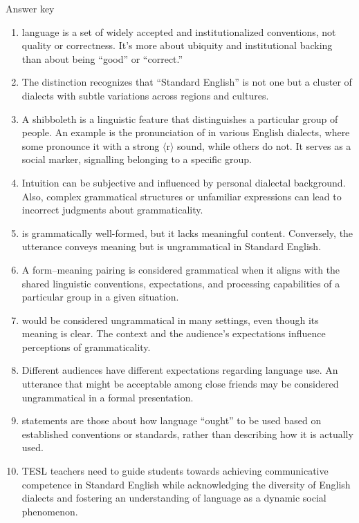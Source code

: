 \begin{tblsfilled}{Answer key}

\begin{enumerate}[noitemsep, leftmargin=*]
    \item {} language is a set of widely accepted and institutionalized conventions, not quality or correctness. It's more about ubiquity and institutional backing than about being \enquote{good} or \enquote{correct.}
    \item The distinction recognizes that \enquote{Standard English} is not one but a cluster of dialects with subtle variations across regions and cultures.
    \item A shibboleth is a linguistic feature that distinguishes a particular group of people. An example is the pronunciation of  in various English dialects, where some pronounce it with a strong $\langle$r$\rangle$ sound, while others do not. It serves as a social marker, signalling belonging to a specific group.
    \item Intuition can be subjective and influenced by personal dialectal background. Also, complex grammatical structures or unfamiliar expressions can lead to incorrect judgments about grammaticality.
    \item {} is grammatically well-formed, but it lacks meaningful content. Conversely, the utterance  conveys meaning but is ungrammatical in Standard English.
    \item A form--meaning pairing is considered grammatical when it aligns with the shared linguistic conventions, expectations, and processing capabilities of a particular group in a given situation.
    \item {} would be considered ungrammatical in many settings, even though its meaning is clear. The context and the audience's expectations influence perceptions of grammaticality.
    \item Different audiences have different expectations regarding language use. An utterance that might be acceptable among close friends may be considered ungrammatical in a formal presentation.
    \item {} statements are those about how language \enquote{ought} to be used based on established conventions or standards, rather than describing how it is actually used.
    \item TESL teachers need to guide students towards achieving communicative competence in Standard English while acknowledging the diversity of English dialects and fostering an understanding of language as a dynamic social phenomenon.
\end{enumerate}
\end{tblsfilled}

